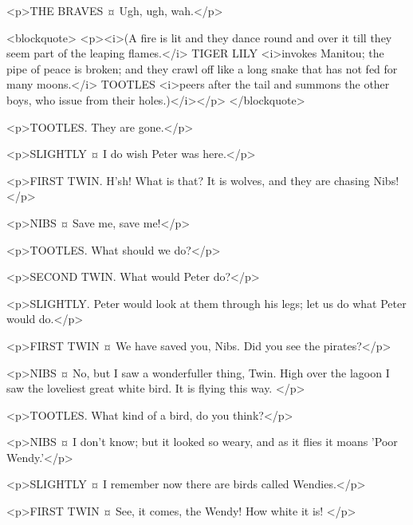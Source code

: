 <p>THE BRAVES ¤
Ugh, ugh, wah.</p>

<blockquote> <p><i>(A fire is lit and they dance round and over it till they seem part of the leaping flames.</i> TIGER LILY <i>invokes Manitou; the pipe of peace is broken; and they crawl off like a long snake that has not fed for many moons.</i> TOOTLES <i>peers after the tail and summons the other boys, who issue from their holes.)</i></p> </blockquote>

<p>TOOTLES. They are gone.</p>

<p>SLIGHTLY ¤
I do wish Peter was here.</p>

<p>FIRST TWIN. H'sh! What is that?
It is wolves, and they are chasing Nibs!</p>


<p>NIBS ¤
Save me, save me!</p>

<p>TOOTLES. What should we do?</p>

<p>SECOND TWIN. What would Peter do?</p>

<p>SLIGHTLY. Peter would look at them through his legs; let us do what Peter would do.</p>


<p>FIRST TWIN ¤
We have saved you, Nibs. Did you see the pirates?</p>

<p>NIBS ¤
No, but I saw a wonderfuller thing, Twin.
High over the lagoon I saw the loveliest great white bird. It is flying this way.
</p>

<p>TOOTLES. What kind of a bird, do you think?</p>

<p>NIBS ¤
I don't know; but it looked so weary, and as it flies it moans 'Poor Wendy.'</p>

<p>SLIGHTLY ¤
I remember now there are birds called Wendies.</p>

<p>FIRST TWIN ¤
See, it comes, the Wendy!
How white it is!
</p>


